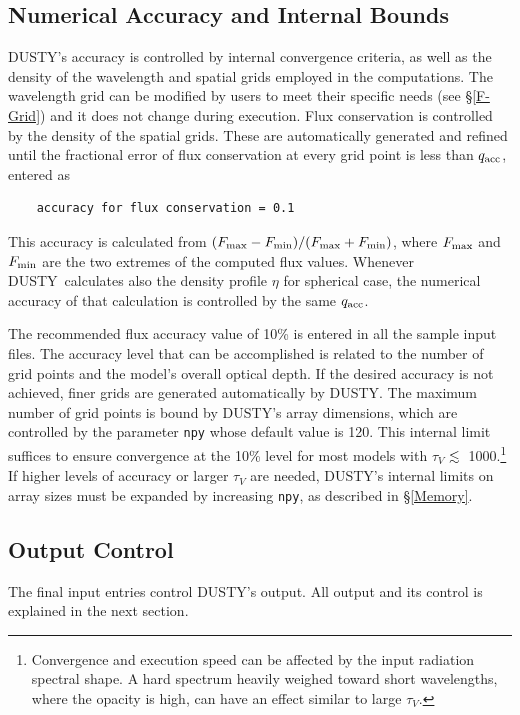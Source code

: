\documentclass[11pt]{article}
\def\D    {{\sf DUSTY}}
\def\la    {\hbox{$\mathrel{\hbox{\raise.3ex\hbox{$<$}\llap
                                {\lower.8ex\hbox{$\sim$}}}}$}}
\def\tV     {\hbox{$\tau_V$}}
\begin{document}
\subsection{Numerical Accuracy and Internal Bounds}
\label{numerics}

\D's accuracy is controlled by internal convergence criteria, as well
as the density of the wavelength and spatial grids employed in the
computations. The wavelength grid can be modified by users to meet
their specific needs (see \S\ref{F-Grid}) and it does not change
during execution. Flux conservation is controlled by the density of
the spatial grids. These are automatically generated and refined until
the fractional error of flux conservation at every grid point is less
than $q_{\rm acc}$, entered as
%
\begin{verbatim}
    accuracy for flux conservation = 0.1
\end{verbatim}
This accuracy is calculated from $(F_{\rm max} - F_{\rm min})/(F_{\rm
  max} + F_{\rm min})$, where $F_{\rm max}$ and $F_{\rm min}$ are the
two extremes of the computed flux values. Whenever \D\ calculates also
the density profile $\eta$ for spherical case, the numerical accuracy
of that calculation is controlled by the same $q_{\rm acc}$.

The recommended flux accuracy value of 10\% is entered in all the
sample input files. The accuracy level that can be accomplished is
related to the number of grid points and the model's overall optical
depth. If the desired accuracy is not achieved, finer grids are
generated automatically by \D. The maximum number of grid points is
bound by \D's array dimensions, which are controlled by the parameter
{\tt npy} whose default value is 120. This internal limit suffices to
ensure convergence at the 10\% level for most models with $\tau_V$
\la\ 1000.\footnote{Convergence and execution speed can be affected by
  the input radiation spectral shape. A hard spectrum heavily weighed
  toward short wavelengths, where the opacity is high, can have an
  effect similar to large \tV.} If higher levels of accuracy or larger
$\tau_V$ are needed, \D's internal limits on array sizes must be
expanded by increasing {\tt npy}, as described in \S\ref{Memory}.

\subsection{Output Control}

The final input entries control \D's output. All output and its control is
explained in the next section.
\end{document}
